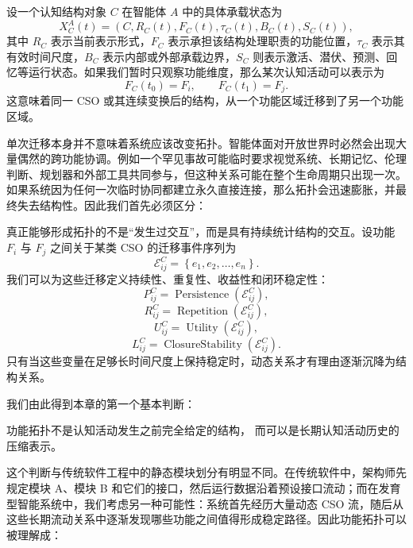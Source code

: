 设一个认知结构对象 $C$ 在智能体 $A$ 中的具体承载状态为
\[
X_C^A(t)
=
\left(
C,
R_C(t),
F_C(t),
\tau_C(t),
B_C(t),
S_C(t)
\right),
\]
其中 $R_C$ 表示当前表示形式，$F_C$ 表示承担该结构处理职责的功能位置，$\tau_C$ 表示其有效时间尺度，$B_C$ 表示内部或外部承载边界，$S_C$ 则表示激活、潜伏、预测、回忆等运行状态。如果我们暂时只观察功能维度，那么某次认知活动可以表示为
\[
F_C(t_0)=F_i,
\qquad
F_C(t_1)=F_j.
\]
这意味着同一 CSO 或其连续变换后的结构，从一个功能区域迁移到了另一个功能区域。

单次迁移本身并不意味着系统应该改变拓扑。智能体面对开放世界时必然会出现大量偶然的跨功能协调。例如一个罕见事故可能临时要求视觉系统、长期记忆、伦理判断、规划器和外部工具共同参与，但这种关系可能在整个生命周期只出现一次。如果系统因为任何一次临时协同都建立永久直接连接，那么拓扑会迅速膨胀，并最终失去结构性。因此我们首先必须区分：
\begin{statementbox}
\centering
{}
\end{statementbox}

真正能够形成拓扑的不是``发生过交互''，而是具有持续统计结构的交互。设功能 $F_i$ 与 $F_j$ 之间关于某类 CSO 的迁移事件序列为
\[
\mathcal{E}_{ij}^{C}
=
\left\{
e_1,e_2,\ldots,e_n
\right\}.
\]
我们可以为这些迁移定义持续性、重复性、收益性和闭环稳定性：
\[
P_{ij}^{C}
=
\operatorname{Persistence}
\left(
\mathcal{E}_{ij}^{C}
\right),
\]
\[
R_{ij}^{C}
=
\operatorname{Repetition}
\left(
\mathcal{E}_{ij}^{C}
\right),
\]
\[
U_{ij}^{C}
=
\operatorname{Utility}
\left(
\mathcal{E}_{ij}^{C}
\right),
\]
\[
L_{ij}^{C}
=
\operatorname{ClosureStability}
\left(
\mathcal{E}_{ij}^{C}
\right).
\]
只有当这些变量在足够长时间尺度上保持稳定时，动态关系才有理由逐渐沉降为结构关系。

我们由此得到本章的第一个基本判断：
\begin{proposition*}
功能拓扑不是认知活动发生之前完全给定的结构，
而可以是长期认知活动历史的压缩表示。
\end{proposition*}

这个判断与传统软件工程中的静态模块划分有明显不同。在传统软件中，架构师先规定模块 A、模块 B 和它们的接口，然后运行数据沿着预设接口流动；而在发育型智能系统中，我们考虑另一种可能性：系统首先经历大量动态 CSO 流，随后从这些长期流动关系中逐渐发现哪些功能之间值得形成稳定路径。因此功能拓扑可以被理解成：
\begin{statementbox}
\centering
{}
\end{statementbox}

